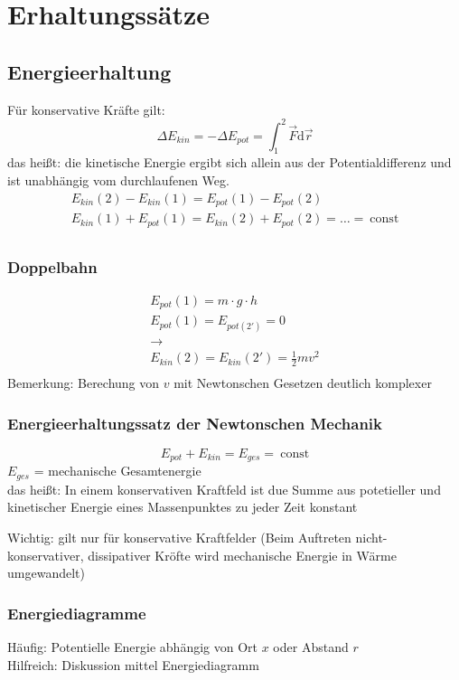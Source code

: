 \documentclass[a4paper]{scrartcl}
\renewcommand{\d}{\mathrm{d}}
\renewcommand{\v}[1]{\vec{#1}}
\theoremstyle{definition}
\theoremstyle{plain}
\theoremstyle{plain}
\theoremstyle{remark}
\theoremstyle{remark}
\theoremstyle{remark}
\begin{document}
\section{Erhaltungssätze}
\label{sec-5}
\subsection{Energieerhaltung}
\label{sec-5-1}
Für konservative Kräfte gilt:
\[\Delta E_{kin} = -\Delta E_{pot} = \int_1^2 \v F\d \v r\]
das heißt: die kinetische Energie ergibt sich allein aus der Potentialdifferenz und ist unabhängig vom durchlaufenen Weg.
\begin{align*}
E_{kin}(2) - E_{kin}(1) = E_{pot}(1) - E_{pot}(2) \\
E_{kin}(1) + E_{pot}(1) = E_{kin}(2) + E_{pot}(2) = \ldots =~\text{const} \\
\end{align*}
\subsubsection{Doppelbahn}
\label{sec-5-1-1}
\begin{align*}
E_{pot}(1) = m\cdot g\cdot h \\
E_{pot}(1) = E_{pot(2')} = 0 \\
\rightarrow \\
E_{kin}(2) = E_{kin}(2') = \frac{1}{2}m v^2 \\
\end{align*}
Bemerkung: Berechung von $v$ mit Newtonschen Gesetzen deutlich komplexer
\subsubsection{Energieerhaltungssatz der Newtonschen Mechanik}
\label{sec-5-1-2}
\[E_{pot} + E_{kin} = E_{ges} = ~\text{const}\]
$E_{ges}$ = mechanische Gesamtenergie \\
    das heißt: In einem konservativen Kraftfeld ist due Summe aus potetieller und kinetischer Energie
eines Massenpunktes zu jeder Zeit konstant

Wichtig: gilt nur für konservative Kraftfelder (Beim Auftreten nicht-konservativer, dissipativer Kröfte wird
mechanische Energie in Wärme umgewandelt)
\subsubsection{Energiediagramme}
\label{sec-5-1-3}
Häufig: Potentielle Energie abhängig von Ort $x$ oder Abstand $r$ \\
    Hilfreich: Diskussion mittel Energiediagramm
\end{document}
